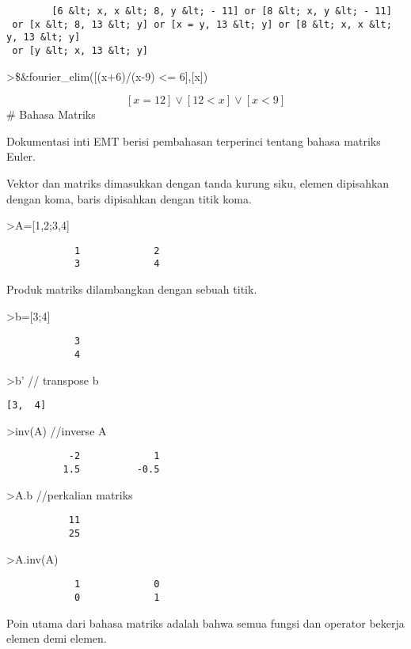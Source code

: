 \documentclass[
]{book}
\begin{document}
\begin{verbatim}
        [6 &lt; x, x &lt; 8, y &lt; - 11] or [8 &lt; x, y &lt; - 11]
 or [x &lt; 8, 13 &lt; y] or [x = y, 13 &lt; y] or [8 &lt; x, x &lt; y, 13 &lt; y]
 or [y &lt; x, 13 &lt; y]
\end{verbatim}

\textgreater\$\&fourier\_elim({[}(x+6)/(x-9) \textless= 6{]},{[}x{]})

\[\left[ x=12 \right] \lor \left[ 12<x \right] \lor \left[ x<9\right]\]\# Bahasa Matriks

Dokumentasi inti EMT berisi pembahasan terperinci tentang bahasa matriks Euler.

Vektor dan matriks dimasukkan dengan tanda kurung siku, elemen dipisahkan dengan koma, baris dipisahkan dengan titik koma.

\textgreater A={[}1,2;3,4{]}

\begin{verbatim}
            1             2 
            3             4 
\end{verbatim}

Produk matriks dilambangkan dengan sebuah titik.

\textgreater b={[}3;4{]}

\begin{verbatim}
            3 
            4 
\end{verbatim}

\textgreater b' // transpose b

\begin{verbatim}
[3,  4]
\end{verbatim}

\textgreater inv(A) //inverse A

\begin{verbatim}
           -2             1 
          1.5          -0.5 
\end{verbatim}

\textgreater A.b //perkalian matriks

\begin{verbatim}
           11 
           25 
\end{verbatim}

\textgreater A.inv(A)

\begin{verbatim}
            1             0 
            0             1 
\end{verbatim}

Poin utama dari bahasa matriks adalah bahwa semua fungsi dan operator bekerja elemen demi elemen.
\end{document}
